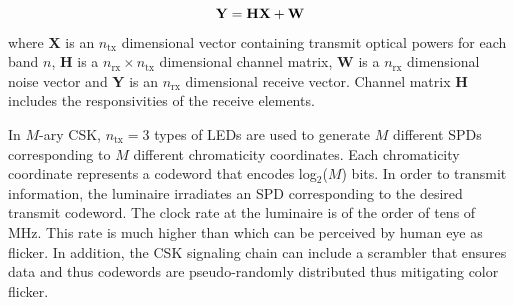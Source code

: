 \documentclass[10pt,letterpaper]{article}
\newcommand{\vm}[1]{{\bf{#1}}}
\begin{document}
\begin{equation}
	\vm{Y} = \vm{H}\vm{X} + \vm{W}
	\label{eqCHNL}
\end{equation}
where \vm{X} is an $n_{\text{tx}}$ dimensional vector containing transmit optical powers for each band $n$, \vm{H} is a $n_{\text{rx}}\times n_{\text{tx}}$ dimensional channel matrix, \vm{W} is a $n_{\text{rx}}$ dimensional noise vector and \vm{Y} is an $n_{\text{rx}}$ dimensional receive vector. Channel matrix \vm{H} includes the responsivities of the receive elements.

In $M$-ary CSK, $n_{\text{tx}}=3$ types of LEDs are used to generate $M$ different SPDs corresponding to $M$ different chromaticity coordinates. Each chromaticity coordinate represents a codeword that encodes log$^{ }_{2}$($M$) bits. In order to transmit information, the luminaire irradiates an SPD corresponding to the desired transmit codeword. The clock rate at the luminaire is of the order of tens of MHz. This rate is much higher than which can be perceived by human eye as flicker. In addition, the CSK signaling chain can include a scrambler that ensures data and thus codewords are pseudo-randomly distributed thus mitigating color flicker.
\end{document}
